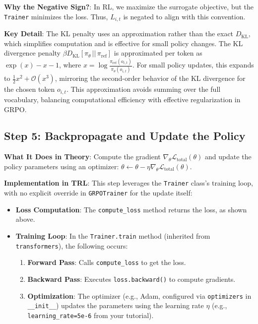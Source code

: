 \documentclass{article}
\begin{document}
\textbf{Why the Negative Sign?}: In RL, we maximize the surrogate objective, but the \texttt{Trainer} minimizes the loss. Thus, \( L_{i,t} \) is negated to align with this convention.

\textbf{Key Detail}: The KL penalty uses an approximation rather than the exact \( D_{\text{KL}} \), which simplifies computation and is effective for small policy changes.
The KL divergence penalty \( \beta D_{\text{KL}}[\pi_\theta \,||\, \pi_{\text{ref}}] \) is approximated per token as \( \exp(x) - x - 1 \), where \( x = \log \frac{\pi_{\text{ref}}(o_{i,t})}{\pi_\theta(o_{i,t})} \). For small policy updates, this expands to \( \frac{1}{2} x^2 + \mathcal{O}(x^3) \), mirroring the second-order behavior of the KL divergence for the chosen token \( o_{i,t} \). This approximation avoids summing over the full vocabulary, balancing computational efficiency with effective regularization in GRPO.

\subsection*{Step 5: Backpropagate and Update the Policy}

\textbf{What It Does in Theory}: Compute the gradient \( \nabla_\theta \mathcal{L}_{\text{total}}(\theta) \) and update the policy parameters using an optimizer: \( \theta \leftarrow \theta - \eta \nabla_\theta \mathcal{L}_{\text{total}}(\theta) \).

\textbf{Implementation in TRL}: This step leverages the \texttt{Trainer} class’s training loop, with no explicit override in \texttt{GRPOTrainer} for the update itself:

\begin{itemize}
    \item \textbf{Loss Computation}: The \texttt{compute\_loss} method returns the loss, as shown above.
    
    \item \textbf{Training Loop}: In the \texttt{Trainer.train} method (inherited from \texttt{transformers}), the following occurs:
    \begin{enumerate}
        \item \textbf{Forward Pass}: Calls \texttt{compute\_loss} to get the loss.
        \item \textbf{Backward Pass}: Executes \texttt{loss.backward()} to compute gradients.
        \item \textbf{Optimization}: The optimizer (e.g., Adam, configured via \texttt{optimizers} in \texttt{\_\_init\_\_}) updates the parameters using the learning rate \( \eta \) (e.g., \texttt{learning\_rate=5e-6} from your tutorial).
    \end{enumerate}
\end{itemize}
\end{document}
